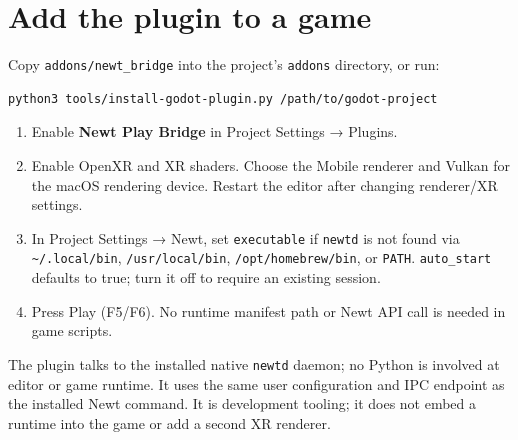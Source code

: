 \documentclass[11pt]{article}
\begin{document}
\section{Add the plugin to a game}
\label{sec:org92e5fd9}
Copy \texttt{addons/newt\_bridge} into the project's \texttt{addons} directory, or run:
\begin{verbatim}
python3 tools/install-godot-plugin.py /path/to/godot-project
\end{verbatim}
\begin{enumerate}
\item Enable \textbf{Newt Play Bridge} in Project Settings → Plugins.
\item Enable OpenXR and XR shaders. Choose the Mobile renderer and Vulkan for the macOS rendering device. Restart the editor after changing renderer/XR settings.
\item In Project Settings → Newt, set \texttt{executable} if \texttt{newtd} is not found via \texttt{\textasciitilde{}/.local/bin}, \texttt{/usr/local/bin}, \texttt{/opt/homebrew/bin}, or \texttt{PATH}. \texttt{auto\_start} defaults to true; turn it off to require an existing session.
\item Press Play (F5/F6). No runtime manifest path or Newt API call is needed in game scripts.
\end{enumerate}

The plugin talks to the installed native \texttt{newtd} daemon; no Python is involved at editor or game runtime. It uses the same user configuration and IPC endpoint as the installed Newt command. It is development tooling; it does not embed a runtime into the game or add a second XR renderer.
\end{document}

